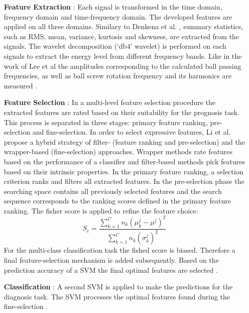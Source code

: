 \begin{itemize}
    \item [\textbf{Feature Extraction}]: Each signal is transformed in the time domain, frequency domain and time-frequency domain. The developed features are applied on all three domains. Similary to Denkena et al. \cite{Denkena2021}, summary statistics, such as RMS, mean, variance, kurtosis and skewness, are extracted from the signals. The wavelet decomposition (‘db4’ wavelet) is performed on each signals to extract the energy level from different frequency bands. Like in the work of Lee et al \cite{Lee2015} the amplitudes corresponding to the calculated ball passing frequencies, as well as ball screw rotation frequency and its harmonics are measured \cite{LiPin2018}.
    \item [\textbf{Feature Selection}]: In a multi-level feature selection procedure the extracted features are rated based on their suitability for the prognosis task. This process is separated in three stages: primary feature ranking, pre-selection and fine-selection. In order to select expressive features, Li et al. \cite{LiPin2018} propose a hybrid strategy of filter- (feature ranking and pre-selection) and the wrapper-based (fine-selection) approaches. Wrapper methods rate features based on the performance of a classifier and filter-based methods pick features based on their intrinsic properties. In the primary feature ranking, a selection criterion ranks and filters all extracted features. In the pre-selection phase the searching space contains all previously selected features and the search sequence corresponds to the ranking scores defined in the primary feature ranking. The fisher score is applied to refine the feature choice:
    \begin{equation}
        S_{c} = \frac{\sum_{k=1}^{C} n_{k}(\mu_{k}^{j}-\mu^{j})^{2}}{\sum_{k=1}^{C}n_{k}(\sigma_{k}^{j})^{2}}
    \end{equation}
    For the multi-class classification task the fished score is biased. Therefore a final feature-selection mechanism is added subsequently. Based on the prediction accuracy of a SVM the final optimal features are selected \cite{LiPin2018}.
    \item [\textbf{Classification}]: A second SVM is applied to make the predictions for the diagnosis task. The SVM processes the optimal features found during the fine-selection \cite{LiPin2018}. 
\end{itemize}

